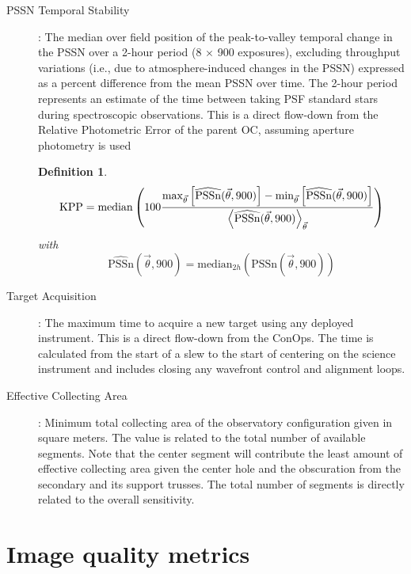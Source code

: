 \documentclass{gmto}
\newtheorem{theorem}{Definition}
\def\median{\ensuremath{\mathrm{median}}}
\begin{document}
\begin{description}
\item[PSSN Temporal Stability]: The median over field position of the
  peak-to-valley temporal change in the PSSN over a 2-hour period (8 $\times$
  900 exposures), excluding throughput variations (i.e., due to
  atmosphere-induced changes in the PSSN) expressed as a percent difference from
  the mean PSSN over time. The 2-hour period represents an estimate of the time
  between taking PSF standard stars during spectroscopic observations. This is a
  direct flow-down from the Relative Photometric Error of the parent OC,
  assuming aperture photometry is used  %
  \begin{theorem}
    \begin{displaymath}
    \mathrm{KPP} = \median\left( 100
      {\max_{\vec\theta}\left[\widehat{\mathrm{PSSn}}(\vec\theta,900)\right]-\min_{\vec\theta}\left[\widehat{\mathrm{PSSn}}(\vec\theta,900)\right]\over\left\langle
       \widehat{\mathrm{PSSn}}(\vec\theta,900) \right\rangle_{\vec\theta}} \right)   
\end{displaymath}
with
\begin{displaymath}
  \widehat{\mathrm{PSSn}}(\vec\theta,900) = \median_{2h}\left( \mathrm{PSSn}(\vec\theta,900) \right)
\end{displaymath}

  \end{theorem}

\item[Target Acquisition]: The maximum time to acquire a new target using any deployed instrument. This is a direct flow-down from the ConOps. The time is calculated from the start of a slew to the start of centering on the science instrument and includes closing any wavefront control and alignment loops.

\item[Effective Collecting Area]: Minimum total collecting area of the observatory configuration given in square meters. The value is related to the total number of available segments. Note that the center segment will contribute the least amount of effective collecting area given the center hole and the obscuration from the secondary and its support trusses. The total number of segments is directly related to the overall sensitivity. 
\end{description}

\section{Image quality metrics}
\label{sec:perf-metrics}
\end{document}

